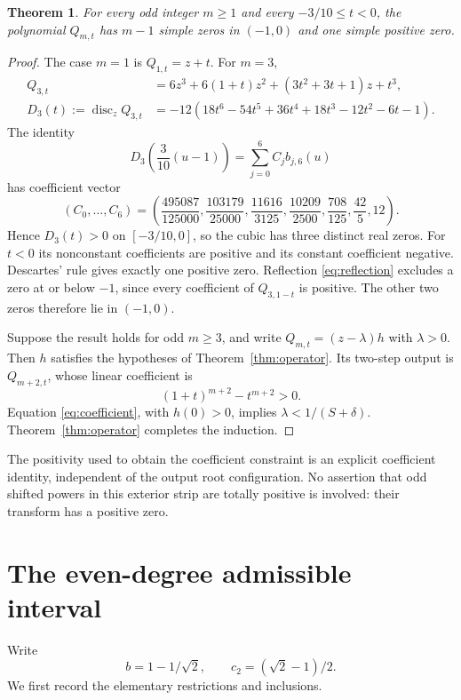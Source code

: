 \documentclass[11pt]{article}
\newtheorem{theorem}{Theorem}[section]
\theoremstyle{remark}
\DeclareMathOperator{\disc}{disc}
\begin{document}
\begin{theorem}\label{thm:odd}
For every odd integer $m\ge1$ and every $-3/10\le t<0$, the polynomial
$Q_{m,t}$ has $m-1$ simple zeros in $(-1,0)$ and one simple positive zero.
\end{theorem}

\begin{proof}
The case $m=1$ is $Q_{1,t}=z+t$. For $m=3$,
\begin{align*}
 Q_{3,t}&=6z^3+6(1+t)z^2+(3t^2+3t+1)z+t^3,\\
 D_3(t):=\disc_zQ_{3,t}
 &=-12(18t^6-54t^5+36t^4+18t^3-12t^2-6t-1).
\end{align*}
The identity
\begin{equation}\label{eq:bernsteinD}
 D_3\!\left(\frac3{10}(u-1)\right)=\sum_{j=0}^6 C_jb_{j,6}(u)
\end{equation}
has coefficient vector
\[
 (C_0,\ldots,C_6)=\left(
 \frac{495087}{125000},\frac{103179}{25000},\frac{11616}{3125},
 \frac{10209}{2500},\frac{708}{125},\frac{42}{5},12\right).
\]
Hence $D_3(t)>0$ on $[-3/10,0]$, so the cubic has three distinct real
zeros. For $t<0$ its nonconstant coefficients are positive and its
constant coefficient negative. Descartes' rule gives exactly one positive
zero. Reflection \eqref{eq:reflection} excludes a zero at or below $-1$,
since every coefficient of $Q_{3,1-t}$ is positive. The other two zeros
therefore lie in $(-1,0)$.

Suppose the result holds for odd $m\ge3$, and write
$Q_{m,t}=(z-\lambda)h$ with $\lambda>0$. Then $h$ satisfies the hypotheses
of Theorem~\ref{thm:operator}. Its two-step output is $Q_{m+2,t}$, whose
linear coefficient is
\[
 (1+t)^{m+2}-t^{m+2}>0.
\]
Equation \eqref{eq:coefficient}, with $h(0)>0$, implies
$\lambda<1/(S+\delta)$. Theorem~\ref{thm:operator} completes the induction.
\end{proof}

The positivity used to obtain the coefficient constraint is an explicit
coefficient identity, independent of the output root configuration.
No assertion that odd shifted powers in this exterior strip are totally
positive is involved: their transform has a positive zero.

\section{The even-degree admissible interval}

Write
\[
 b=1-1/\sqrt2,\qquad c_2=(\sqrt2-1)/2.
\]
We first record the elementary restrictions and inclusions.
\end{document}
